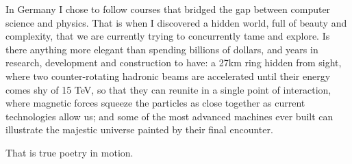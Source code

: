 In Germany I chose to follow courses that bridged the gap between computer science and physics. That
is when I discovered a hidden world, full of beauty and complexity, that we are currently trying to
concurrently tame and explore. Is there anything more elegant than spending billions of dollars,
and years in research, development and construction to have: a 27km ring hidden from sight, where two
counter-rotating hadronic beams are accelerated until their energy comes shy of 15 TeV, so that
they can reunite in a single point of interaction, where magnetic forces squeeze the particles as
close together as current technologies allow us; and some of the most advanced machines ever built
can illustrate the majestic universe painted by their final encounter.

That is true poetry in motion.
